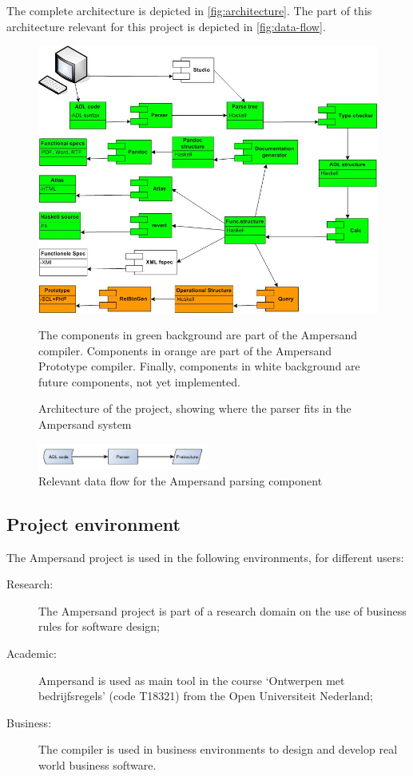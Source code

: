 %
The complete architecture is depicted in \autoref{fig:architecture}.
The part of this architecture relevant for this project is depicted in \autoref{fig:data-flow}.
%
\begin{figure}[htb]
	\centering
	\includegraphics[width=\textwidth]{Figures/ADL_systeemarchitectuur}
	\caption[Architecture of the project]{Architecture of the project, showing where the parser fits in the Ampersand system}
	\label{fig:architecture}
	\small
	The components in green background are part of the Ampersand compiler.
	Components in orange are part of the Ampersand Prototype compiler.
	Finally, components in white background are future components, not yet implemented.
\end{figure}
%
\begin{figure}[htb]
	\centering
	\includegraphics[width=0.5\textwidth]{Figures/Architecture}
	\caption{Relevant data flow for the Ampersand parsing component}
	\label{fig:data-flow}
\end{figure}

\subsection{Project environment}
The Ampersand project is used in the following environments, for different users:
\begin{description}
	\item[Research:] The Ampersand project is part of a research domain on the use of business rules for software design;
	\item[Academic:] Ampersand is used as main tool in the course `Ontwerpen met bedrijfsregels' (code T18321) from the Open Universiteit Nederland;
	\item[Business:] The compiler is used in business environments to design and develop real world business software.
\end{description}

